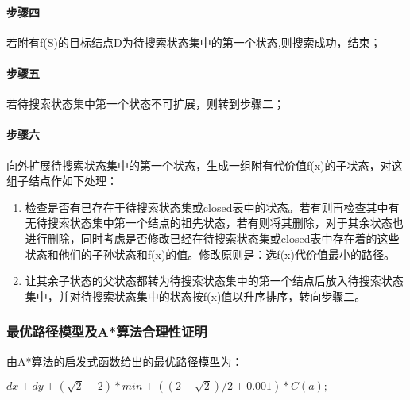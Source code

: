 \documentclass[withoutpreface,bwprint]{cumcmthesis} %
\begin{document}
\paragraph{步骤四}
若附有f(S)的目标结点D为待搜索状态集中的第一个状态,则搜索成功，结束；

\paragraph{步骤五}
若待搜索状态集中第一个状态不可扩展，则转到步骤二；

\paragraph{步骤六}
向外扩展待搜索状态集中的第一个状态，生成一组附有代价值f(x)的子状态，对这组子结点作如下处理：
\begin{enumerate}[itemindent=1em] 
    \renewcommand{\labelenumi}{(\theenumi)}
    \item 检查是否有已存在于待搜索状态集或closed表中的状态。若有则再检查其中有无待搜索状态集中第一个结点的祖先状态，若有则将其删除，对于其余状态也进行删除，同时考虑是否修改已经在待搜索状态集或closed表中存在着的这些状态和他们的子孙状态和f(x)的值。修改原则是：选f(x)代价值最小的路径。
    \item 让其余子状态的父状态都转为待搜索状态集中的第一个结点后放入待搜索状态集中，并对待搜索状态集中的状态按f(x)值以升序排序，转向步骤二。
\end{enumerate}

\subsubsection{最优路径模型及A*算法合理性证明}
由A*算法的启发式函数给出的最优路径模型为：

\begin{center}
    $dx + dy + (\sqrt{2} - 2) * min + ((2 - \sqrt{2}) / 2 + 0.001) * C(a);$%
\end{center}
\end{document}
